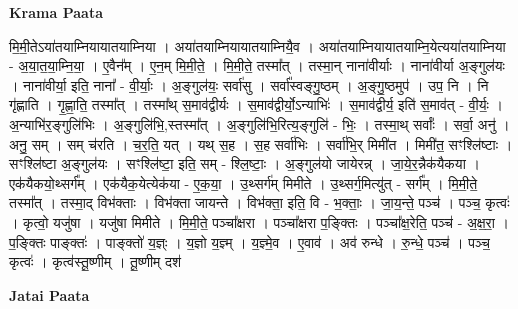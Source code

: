 \documentclass[17pt]{extarticle}
\begin{document}
\textbf{Krama Paata} \newline

मि॒मी॒तेऽया॑तयाम्नियायातयाम्निया । अया॑तयाम्नियायातयाम्नियै॒व । अया॑तयाम्नियायातयाम्नि॒येत्यया॑तयाम्निया - अ॒या॒त॒या॒म्नि॒या॒ । ए॒वैन᳚म् । ए॒न॒म् मि॒मी॒ते॒ । मि॒मी॒ते॒ तस्मा᳚त् । तस्मा॒न् नाना॑वीर्याः । नाना॑वीर्या अ॒ङ्‍गुल॑यः । नाना॑वीर्या॒ इति॒ नाना᳚ - वी॒र्याः॒ । अ॒ङ्‍गुल॑यः॒ सर्वा॑सु । सर्वा᳚स्वङ्‍गु॒ष्ठम् । अ॒ङ्‍गु॒ष्ठमुप॑ । उप॒ नि । नि गृ॑ह्णाति । गृ॒ह्णा॒ति॒ तस्मा᳚त् । तस्मा᳚थ् स॒माव॑द्वीर्यः । स॒माव॑द्वीर्यो॒ऽन्याभिः॑ । स॒माव॑द्वीर्य॒ इति॑ स॒माव॑त् - वी॒र्यः॒ । अ॒न्याभि॑र॒ङ्‍गुलि॑भिः । अ॒ङ्‍गुलि॑भि॒,स्तस्मा᳚त् । अ॒ङ्‍गुलि॑भि॒रित्य॒ङ्‍गुलि॑ - भिः॒ । तस्मा॒थ् सर्वाः᳚ । सर्वा॒ अनु॑ । अनु॒ सम् । सम् च॑रति । च॒र॒ति॒ यत् । यथ् स॒ह । स॒ह सर्वा॑भिः । सर्वा॑भि॒र् मिमी॑त । मिमी॑त॒ सꣳश्लि॑ष्टाः । सꣳश्लि॑ष्टा अ॒ङ्‍गुल॑यः । सꣳश्लि॑ष्टा॒ इति॒ सम् - श्लि॒ष्टाः॒ । अ॒ङ्‍गुल॑यो जायेरन्न् । जा॒ये॒र॒न्नैक॑यैकया । एक॑यैकयो॒थ्सर्ग᳚म् । एक॑यैक॒येत्येक॑या - ए॒क॒या॒ । उ॒थ्सर्ग॑म् मिमीते । उ॒थ्सर्ग॒मित्यु॑त् - सर्ग᳚म् । मि॒मी॒ते॒ तस्मा᳚त् । तस्मा॒द् विभ॑क्ताः । विभ॑क्ता जायन्ते । विभ॑क्ता॒ इति॒ वि - भ॒क्ताः॒ । जा॒य॒न्ते॒ पञ्च॑ । पञ्च॒ कृत्वः॑ । कृत्वो॒ यजु॑षा । यजु॑षा मिमीते । मि॒मी॒ते॒ पञ्चा᳚क्षरा । पञ्चा᳚क्षरा प॒ङ्‍क्तिः । पञ्चा᳚क्ष॒रेति॒ पञ्च॑ - अ॒क्ष॒रा॒ । प॒ङ्‍क्तिः पाङ्‍क्तः॑ । पाङ्‍क्तो॑ य॒ज्ञ्ः । य॒ज्ञो य॒ज्ञ्म् । य॒ज्ञ्मे॒व । ए॒वाव॑ । अव॑ रुन्धे । रु॒न्धे॒ पञ्च॑ । पञ्च॒ कृत्वः॑ । कृत्व॑स्तू॒ष्णीम् । तू॒ष्णीम् दश॑ \newline

\textbf{Jatai Paata} \newline
\end{document}
